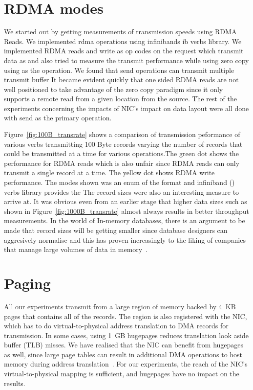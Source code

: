 


\section{RDMA modes}
We started out by getting measurements of transmission speeds using RDMA Reads.
We implemented rdma operations using infinibands ib verbs library. We implemented 
RDMA reads and write as op codes on the  request which 
transmit data as  and also tried to measure the transmit
performance while using zero copy using  as the operation.
We found that send operations can transmit multiple transmit buffer
It became evident quickly that one sided RDMA reads are not well positioned to 
take advantage of the zero copy paradigm since it only supports a remote read 
from a given location from the source. The rest of the experiments concerning
the impacts of NIC's impact on data layout were all done with send as the primary
operation. 


Figure~\ref{fig:100B_transrate} shows a comparison of transmission
peformance of various verbs transmitting 100 Byte records varying the number of records
that could be transmitted at a time for various operations.The green dot shows
the performance for RDMA reads which is also unfair
since RDMA reads can only transmit a single record at a time. The yellow dot
shows RDMA write performance. The modes shown was an enum of the format 
 and infiniband 
() verbs library provides the  The record sizes were 
also an interesting measure to arrive at. It was obvious even from an earlier stage
that higher data sizes such as shown in Figure~\ref{fig:1000B_transrate} almost 
always results in better throughput measurements. In the world of In-memory databases,
there is an argument to be made that record sizes will be getting smaller since 
database designers can aggresively normalise and this has proven increasingly to
the liking of companies that manage large volumes of data in memory~\cite{fb-memcache,fb-workload}.


\section{Paging}
All our experiments transmit from a large region of memory backed by 4~KB pages
that contains all of the records. The region is also
registered with the NIC, which has to do virtual-to-physical address
translation to DMA records for transmission.
In some cases, using 1~GB hugepages reduces translation look aside buffer
(TLB) misses. We have realised that the NIC can benefit from
hugepages as well, since large page tables can result in additional
DMA operations to host memory during address translation~\cite{farm,rdma}. For
our experiments, the reach of the NIC's virtual-to-physical mapping is
sufficient, and hugepages have no impact on the results.



